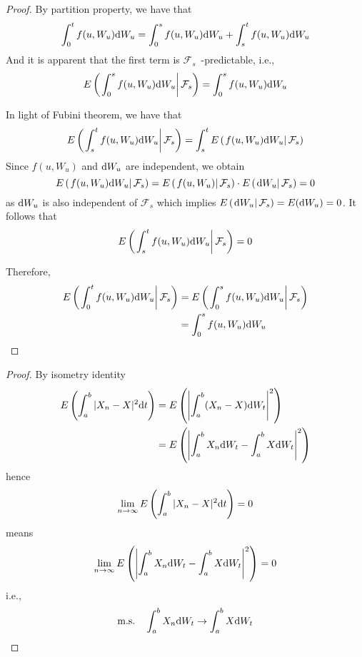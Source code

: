 \documentclass{homework}
\begin{document}
    \problem
    \begin{proof}
        \newcommand{\conde}[1]{E\left(\left. #1\right|\mathcal F_s\right)}
        By partition property, we have that
        \[\int_0^tf(u,W_u)\mathrm d W_u=\int_0^sf(u,W_u)\mathrm d W_u
        +\int_s^tf(u,W_u)\mathrm d W_u\]
        And it is apparent that the first term is
        $\mathcal F_s$~-predictable, i.e.,
        \[\conde{\int_0^sf(u,W_u)\diff W_u}=\int_0^sf(u,W_u)\diff W_u\]
        

        In light of Fubini theorem, we have that
        \[\conde{\int_s^tf(u,W_u)\diff W_u}
            =\int_s^t\conde{f(u,W_u)\diff W_u}\]
        Since $f(u,W_u)$ and $\mathrm d W_u$ are independent, we obtain
        \[\conde{f(u,W_u)\diff W_u}=\conde{f(u,W_u)}\cdot\conde{\diff W_u}
        =0\]
        as $\mathrm d W_u$ is also independent of $\mathcal F_s$ which implies
        $\conde{\diff W_u}=E(\diff W_u)=0$. It follows that
        \[\conde{\int_s^tf(u,W_u)\diff W_u}=0\]

        Therefore,
        \[\begin{aligned}
        \conde{\int_0^tf(u,W_u)\diff W_u}
        &=\conde{\int_0^sf(u,W_u)\diff W_u}\\
        &=\int_0^sf(u,W_u)\diff W_u
        \end{aligned}\]
    \end{proof}


    \problem
    \begin{proof}
        By isometry identity
        \[\begin{aligned}
            E\left(\int_a^b|X_n-X|^2\mathrm d t\right)
            &=E\left(\left|\int_a^b(X_n-X)\mathrm d W_t\right|^2\right)\\
            &=E\left(\left|
            \int_a^bX_n\mathrm d W_t-\int_a^bX\mathrm d W_t
            \right|^2\right)
        \end{aligned}\]
        hence
        \[\lim_{n\to\infty}E\left(
            \int_a^b|X_n-X|^2\mathrm d t\right)=0\]
        means
        \[\lim_{n\to\infty}E\left(\left|
            \int_a^bX_n\mathrm d W_t-\int_a^bX\mathrm d W_t
            \right|^2\right)=0\]
        i.e.,
        \[\text{m.s.}\quad
        \int_a^bX_n\mathrm d W_t\to\int_a^bX\mathrm d W_t\]
    \end{proof}
\end{document}
